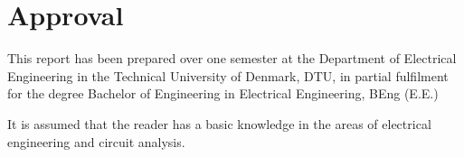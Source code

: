 \chapter*{Approval} 
This report has been prepared over one semester at the Department of Electrical Engineering in the Technical University of Denmark, DTU, in partial fulfilment for the degree Bachelor of Engineering in Electrical Engineering, BEng (E.E.) 

It is assumed that the reader has a basic knowledge in the areas of electrical engineering and circuit analysis. 

\vfill

\begin{center}
\namesigdate{\thesisauthor~-~\studentnumber}
\end{center}

\vfill

